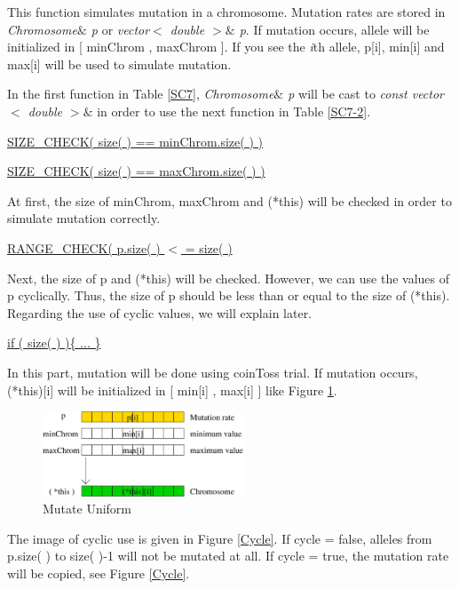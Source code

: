 \documentclass[twocolumn]{article}
\begin{document}
\noindent
This function simulates mutation in a chromosome. Mutation rates are
stored in {\em Chromosome$\&$ p} or {\em vector$<$ double $>$$\&$
p}. If mutation occurs, allele will be initialized in [ minChrom ,
maxChrom ]. If you see the {\em i}th allele, p[i], min[i] and max[i] will
be used to simulate mutation.

\noindent
In the first function in Table \ref{SC7}, {\em Chromosome$\&$ p} will be
cast to {\em const vector$<$ double $>$$\&$} in order to use the next
function in Table \ref{SC7-2}.

\vspace*{2mm}

\noindent
\underline{SIZE\_CHECK( size( ) == minChrom.size( ) )}

\noindent
\underline{SIZE\_CHECK( size( ) == maxChrom.size( ) )}

\noindent
At first, the size of minChrom, maxChrom and (*this) will be checked
in order to simulate mutation correctly.

\vspace*{2mm}

\noindent
\underline{RANGE\_CHECK( p.size( ) $<$ = size( )}

\noindent
Next, the size of p and (*this) will be checked. However, we can use
the values of p cyclically. Thus, the size of p should be less than or
equal to the size of (*this). Regarding the use of cyclic values, we will explain
later.

\vspace*{2mm}

\noindent
\underline{if ( size( ) )\{ ... \}}

\noindent
In this part, mutation will be done using coinToss trial. If
mutation occurs, (*this)[i] will be initialized in [ min[i] , max[i]
] like Figure \ref{MutateUniform}.

\begin{figure}[h]
\begin{center}
\includegraphics[width=6cm]{mutateUniform.eps}
\caption{Mutate Uniform}
\label{MutateUniform}
\end{center}
\end{figure}

\noindent
The image of cyclic use is given in Figure \ref{Cycle}. If cycle =
false, alleles from p.size( ) to size( )-1 will not be mutated at
all. If cycle = true, the mutation rate will be copied, see Figure
\ref{Cycle}.
\end{document}
